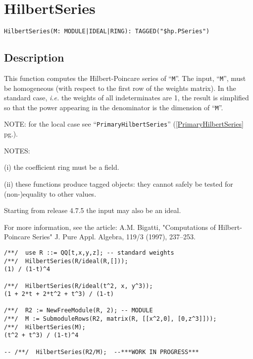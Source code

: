 \documentclass[a4paper]{mybook}
\newenvironment{command}{}{} %
\begin{document}
\section{HilbertSeries}
\label{HilbertSeries}
\begin{command} %


\begin{Verbatim}[label=syntax, rulecolor=\color{MidnightBlue},
frame=single]
HilbertSeries(M: MODULE|IDEAL|RING): TAGGED("$hp.PSeries")
\end{Verbatim}


\subsection*{Description}

This function computes the Hilbert-Poincare series of ``\verb&M&''.
The input, ``\verb&M&'', must be homogeneous (with respect to the first row of
the weights matrix).  In the standard case, \textit{i.e.} the weights of all
indeterminates are 1, the result is simplified so that the power
appearing in the denominator is the dimension of ``\verb&M&''.
\par 
NOTE: for the local case see ``\verb&PrimaryHilbertSeries&'' (\ref{PrimaryHilbertSeries} pg.\pageref{PrimaryHilbertSeries}).
\par 
NOTES:
\par 
(i) the coefficient ring must be a field.
\par 
(ii) these functions produce tagged objects: they cannot safely be
     tested for (non-)equality to other values.
\par 
Starting from release 4.7.5 the input may also be an ideal.
\par 
For more information, see the article: A.M. Bigatti, "Computations of
Hilbert-Poincare Series" J. Pure Appl. Algebra, 119/3 (1997),
237--253.
\begin{Verbatim}[label=example, rulecolor=\color{PineGreen}, frame=single]
/**/  use R ::= QQ[t,x,y,z]; -- standard weights
/**/  HilbertSeries(R/ideal(R,[]));
(1) / (1-t)^4

/**/  HilbertSeries(R/ideal(t^2, x, y^3));
(1 + 2*t + 2*t^2 + t^3) / (1-t)

/**/  R2 := NewFreeModule(R, 2); -- MODULE
/**/  M := SubmoduleRows(R2, matrix(R, [[x^2,0], [0,z^3]]));
/**/  HilbertSeries(M);
(t^2 + t^3) / (1-t)^4

-- /**/  HilbertSeries(R2/M);  --***WORK IN PROGRESS***


\end{Verbatim}
\end{command}
\end{document}
